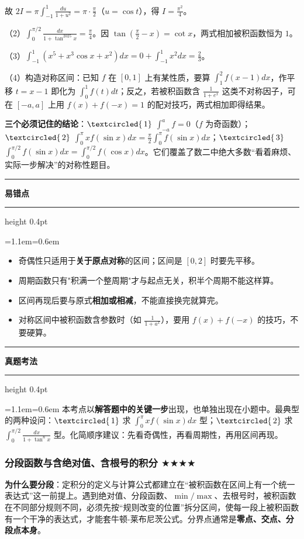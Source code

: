 \documentclass[11pt,openany,UTF8]{ctexbook}
\newcommand{\circled}[1]{\textcircled{\scriptsize\,#1}}
\newcommand{\callouthead}[2]{%
  \par\addvspace{7pt}\noindent
  {\color{#1}\rule[-0.15em]{3pt}{1.05em}}\hspace{0.5em}%
  {\bfseries\color{#1}#2}\par\nobreak\vspace{-0.35em}%
  {\color{rulesep}\hrule height 0.4pt}\nobreak\vspace{0.45em}%
  \begingroup\small\setlength{\parindent}{0pt}%
  \leftskip=1.1em\rightskip=0.6em\noindent\ignorespaces}
\newcommand{\calloutend}{\par\endgroup\addvspace{7pt}}
\newenvironment{callwarn}[1]{\callouthead{warnbar}{#1}}{\calloutend}
\newenvironment{callexam}[1]{\callouthead{exambar}{#1}}{\calloutend}
\begin{document}
故 $2I=\pi\int_{-1}^{1}\frac{du}{1+u^2}=\pi\cdot\frac{\pi}{2}$（$u=\cos t$），得 $I=\frac{\pi^2}{4}$。

（2）$\displaystyle\int_0^{\pi/2}\frac{dx}{1+\tan^{2025}x}=\frac{\pi}{4}$。因 $\tan\left(\frac{\pi}{2}-x\right)=\cot x$，两式相加被积函数恒为 $1$。

（3）$\displaystyle\int_{-1}^{1}\left(x^5+x^3\cos x+x^2\right)dx=0+\int_{-1}^{1}x^2dx=\frac{2}{3}$。

（4）构造对称区间：已知 $f$ 在 $[0,1]$ 上有某性质，要算 $\int_1^2f(x-1)dx$，作平移 $t=x-1$ 即化为 $\int_0^1f(t)dt$；反之，若被积函数含 $\frac{1}{1+e^x}$ 这类不对称因子，可在 $[-a,a]$ 上用 $f(x)+f(-x)=1$ 的配对技巧，两式相加即得结果。

\textbf{三个必须记住的结论}：$\circled{1}$ $\int_{-a}^{a}f=0$（$f$ 为奇函数）；$\circled{2}$ $\int_0^{\pi}xf(\sin x)dx=\frac{\pi}{2}\int_0^{\pi}f(\sin x)dx$；$\circled{3}$ $\int_0^{\pi/2}f(\sin x)dx=\int_0^{\pi/2}f(\cos x)dx$。它们覆盖了数二中绝大多数“看着麻烦、实际一步解决”的对称性题目。

\begin{callwarn}{易错点}
\begin{itemize}
\item 奇偶性只适用于\textbf{关于原点对称}的区间；区间是 $[0,2]$ 时要先平移。
\item 周期函数只有"积满一个整周期"才与起点无关，积半个周期不能这样算。
\item 区间再现后要与原式\textbf{相加或相减}，不能直接换完就算完。
\item 对称区间中被积函数含参数时（如 $\frac{1}{1+a^x}$），要用 $f(x)+f(-x)$ 的技巧，不要硬算。
\end{itemize}
\end{callwarn}

\begin{callexam}{真题考法}
本考点以\textbf{解答题中的关键一步}出现，也单独出现在小题中。最典型的两种设问：$\circled{1}$ 求 $\int_0^{\pi}xf(\sin x)dx$ 型；$\circled{2}$ 求 $\int_0^{\pi/2}\frac{dx}{1+\tan^n x}$ 型。化简顺序建议：先看奇偶性，再看周期性，再用区间再现。

\end{callexam}

\subsubsection{分段函数与含绝对值、含根号的积分 $\bigstar$$\bigstar$$\bigstar$$\bigstar$}

\textbf{为什么要分段}：定积分的定义与计算公式都建立在“被积函数在区间上有一个统一表达式”这一前提上。遇到绝对值、分段函数、$\min/\max$、去根号时，被积函数在不同部分规则不同，必须先按“规则改变的位置”拆分区间，使每一段上被积函数有一个干净的表达式，才能套牛顿-莱布尼茨公式。分界点通常是\textbf{零点、交点、分段点本身}。
\end{document}
